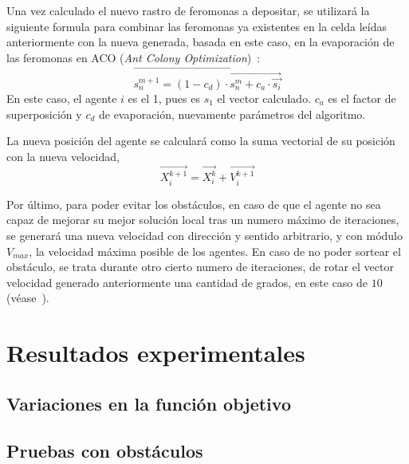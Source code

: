 \documentclass[runningheads]{llncs}
\begin{document}
    Una vez calculado el nuevo rastro de feromonas a depositar, se utilizará la siguiente formula para combinar las
    feromonas ya existentes en la celda leídas anteriormente con la nueva generada, basada en este caso, en la
    evaporación de las feromonas en ACO (\textit{Ant Colony Optimization})~\cite{ACO}:
    \[
        \vec{s_n^{m+1}=(1-c_d)\cdot\vec{s_n^m+c_a\cdot\vec{s_i}}}
    \]
    En este caso, el agente $i$ es el 1, pues es $s_1$ el vector calculado. $c_a$ es el factor de superposición
    y $c_d$ de evaporación, nuevamente parámetros del algoritmo.

    La nueva posición del agente se calculará como la suma vectorial de su posición con la nueva velocidad,
    \[  \vec{ X_i^{k+1} } = \vec{X_i^k} + \vec{ V_i^{k+1} }  \]

    Por último, para poder evitar los obstáculos, en caso de que el agente no sea capaz de mejorar su mejor solución
    local tras un numero máximo de iteraciones, se generará una nueva velocidad con dirección y sentido arbitrario,
    y con módulo $V_{max}$, la velocidad máxima posible de los agentes. En caso de no poder sortear el obstáculo, se
    trata durante otro cierto numero de iteraciones, de rotar el vector velocidad generado anteriormente una cantidad
    de grados, en este caso de $10$ (véase~\cite{referencedPaper}).


    \section{Resultados experimentales}



    \subsection{Variaciones en la función objetivo}


    \subsection{Pruebas con obstáculos}
\end{document}
